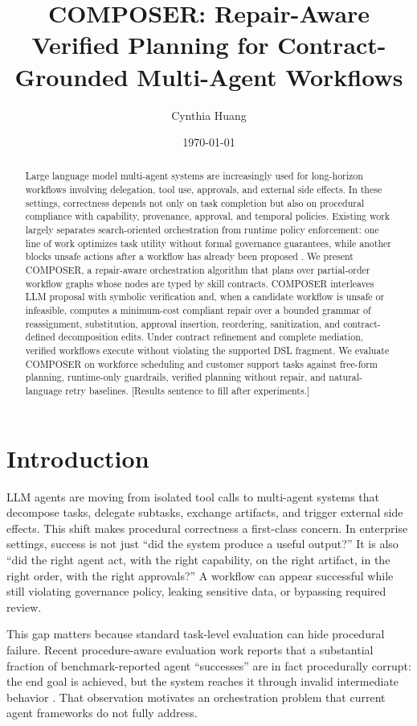 \documentclass[11pt]{article}
\title{COMPOSER: Repair-Aware Verified Planning for Contract-Grounded Multi-Agent Workflows}
\author{Cynthia Huang}
\date{\today}
\begin{document}
\maketitle

\begin{abstract}
Large language model multi-agent systems are increasingly used for long-horizon workflows involving delegation, tool use, approvals, and external side effects. In these settings, correctness depends not only on task completion but also on procedural compliance with capability, provenance, approval, and temporal policies. Existing work largely separates search-oriented orchestration from runtime policy enforcement: one line of work optimizes task utility without formal governance guarantees, while another blocks unsafe actions after a workflow has already been proposed \citep{AFlow,ADAS,PCAS,Maris,Agent-C}. We present COMPOSER, a repair-aware orchestration algorithm that plans over partial-order workflow graphs whose nodes are typed by skill contracts. COMPOSER interleaves LLM proposal with symbolic verification and, when a candidate workflow is unsafe or infeasible, computes a minimum-cost compliant repair over a bounded grammar of reassignment, substitution, approval insertion, reordering, sanitization, and contract-defined decomposition edits. Under contract refinement and complete mediation, verified workflows execute without violating the supported DSL fragment. We evaluate COMPOSER on workforce scheduling and customer support tasks against free-form planning, runtime-only guardrails, verified planning without repair, and natural-language retry baselines. [Results sentence to fill after experiments.]
\end{abstract}

\section{Introduction}
LLM agents are moving from isolated tool calls to multi-agent systems that decompose tasks, delegate subtasks, exchange artifacts, and trigger external side effects. This shift makes procedural correctness a first-class concern. In enterprise settings, success is not just ``did the system produce a useful output?'' It is also ``did the right agent act, with the right capability, on the right artifact, in the right order, with the right approvals?'' A workflow can appear successful while still violating governance policy, leaking sensitive data, or bypassing required review.

This gap matters because standard task-level evaluation can hide procedural failure. Recent procedure-aware evaluation work reports that a substantial fraction of benchmark-reported agent ``successes'' are in fact procedurally corrupt: the end goal is achieved, but the system reaches it through invalid intermediate behavior \citep{PAE}. That observation motivates an orchestration problem that current agent frameworks do not fully address.
\end{document}
